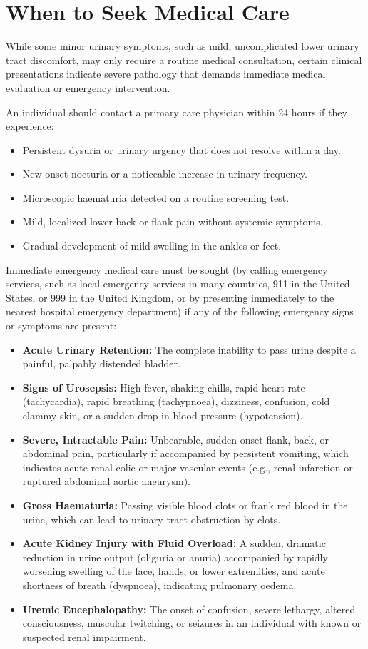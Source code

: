 \section*{When to Seek Medical Care}
While some minor urinary symptoms, such as mild, uncomplicated lower urinary tract discomfort, may only require a routine medical consultation, certain clinical presentations indicate severe pathology that demands immediate medical evaluation or emergency intervention.

An individual should contact a primary care physician within 24 hours if they experience:
\begin{itemize}
    \item Persistent dysuria or urinary urgency that does not resolve within a day.
    \item New-onset nocturia or a noticeable increase in urinary frequency.
    \item Microscopic haematuria detected on a routine screening test.
    \item Mild, localized lower back or flank pain without systemic symptoms.
    \item Gradual development of mild swelling in the ankles or feet.
\end{itemize}

Immediate emergency medical care must be sought (by calling emergency services, such as local emergency services in many countries, 911 in the United States, or 999 in the United Kingdom, or by presenting immediately to the nearest hospital emergency department) if any of the following emergency signs or symptoms are present:
\begin{itemize}
    \item \textbf{Acute Urinary Retention:} The complete inability to pass urine despite a painful, palpably distended bladder.
    \item \textbf{Signs of Urosepsis:} High fever, shaking chills, rapid heart rate (tachycardia), rapid breathing (tachypnoea), dizziness, confusion, cold clammy skin, or a sudden drop in blood pressure (hypotension).
    \item \textbf{Severe, Intractable Pain:} Unbearable, sudden-onset flank, back, or abdominal pain, particularly if accompanied by persistent vomiting, which indicates acute renal colic or major vascular events (e.g., renal infarction or ruptured abdominal aortic aneurysm).
    \item \textbf{Gross Haematuria:} Passing visible blood clots or frank red blood in the urine, which can lead to urinary tract obstruction by clots.
    \item \textbf{Acute Kidney Injury with Fluid Overload:} A sudden, dramatic reduction in urine output (oliguria or anuria) accompanied by rapidly worsening swelling of the face, hands, or lower extremities, and acute shortness of breath (dyspnoea), indicating pulmonary oedema.
    \item \textbf{Uremic Encephalopathy:} The onset of confusion, severe lethargy, altered consciousness, muscular twitching, or seizures in an individual with known or suspected renal impairment.
\end{itemize}

